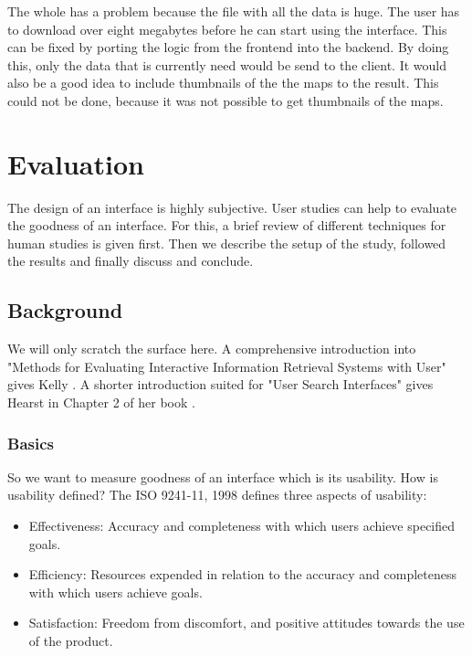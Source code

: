 \documentclass[11pt]{report}
\begin{document}
The whole has a problem because the  file with all the data is huge. The user has to download over eight megabytes before he can start using the interface. This can be fixed by porting the logic from the frontend into the backend. By doing this, only the data that is currently need would be send to the client. It would also be a good idea to include thumbnails of the the maps to the result. This could not be done, because it was not possible to get thumbnails of the maps.

\chapter{Evaluation}
\label{Evaluation}

The design of an interface is highly subjective. User studies can help to evaluate the goodness of an interface. For this, a brief review of different techniques for human studies is given first. Then we describe the setup of the study, followed the results and finally discuss and conclude.

\section{Background}

We will only scratch the surface here. A comprehensive introduction into "Methods for Evaluating Interactive Information Retrieval Systems with User" gives Kelly \cite{Kelly2007}. A shorter introduction suited for "User Search Interfaces" gives Hearst in Chapter 2 of her book \cite{Hearst2009}.

\subsection{Basics}

So we want to measure goodness of an interface which is its usability. How is usability defined? The ISO 9241-11, 1998 \cite{ISO} defines three aspects of usability:
\begin{itemize}
	\item Effectiveness: Accuracy and completeness with which users achieve specified goals.
	\item Efficiency: Resources expended in relation to the accuracy and completeness with which users achieve goals.
	\item Satisfaction: Freedom from discomfort, and positive attitudes towards the use of the product.
\end{itemize}
\end{document}
